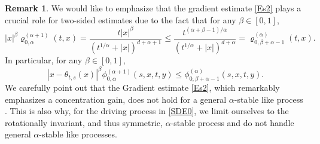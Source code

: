 \documentclass[11pt]{article}
\numberwithin{equation}{section}\providecommand{\asymp}{\mathrel{\sim}}
\theoremstyle{plain}
\theoremstyle{definition}
\newtheorem{remark}[theorem]{Remark}
\newcommand\1{{\mathbf{1}}}
\begin{document}
\begin{remark}\rm \label{IMP_REM}
We would like to emphasize that the gradient estimate \eqref{Es2} plays a crucial role for two-sided estimates due to the fact
that for any $\beta\in[0,1]$,
\[
|x|^\beta\varrho^{(\alpha+1)}_{0,\alpha}(t,x)=\frac{t|x|^\beta}{(t^{1/\alpha}+|x|)^{d+\alpha+1}}
\leq\frac{t^{(\alpha+\beta-1)/\alpha}}{(t^{1/\alpha}+|x|)^{d+\alpha}}=\varrho^{(\alpha)}_{0,\beta+\alpha-1}(t,x).
\]
In particular, for any $\beta\in[0,1]$,
\begin{equation}\label{AA1}
|x-\theta_{t,s}(x)|^\beta\phi^{(\alpha+1)}_{0,\alpha}(s,x,t,y)
\leq\phi^{(\alpha)}_{0,\beta+\alpha-1}(s,x,t,y).
\end{equation}
We carefully point out that the Gradient estimate \eqref{Es2}, which remarkably emphasizes a concentration gain, does not hold for a general $\alpha$-stable like process \cite{DZ}. This is also why, for the driving process in \eqref{SDE0}, we limit
ourselves to the rotationally invariant, and thus symmetric,
$\alpha$-stable process and do not handle general $\alpha$-stable like processes.
\end{remark}
\end{document}
